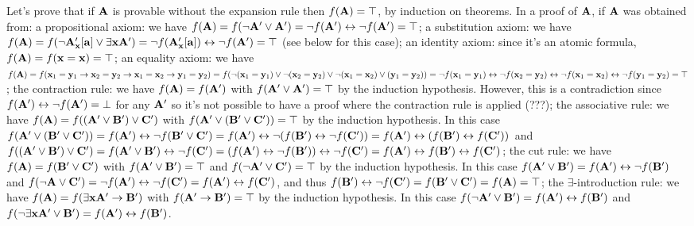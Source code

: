 Let's prove that if ${\bf A}$ is provable without the expansion rule then $f({\bf A}) = \top$, by induction on theorems.
In a proof of ${\bf A}$, if ${\bf A}$ was obtained from:
\itemitem{$\bullet$} a propositional axiom: we have $f({\bf A}) = f(\neg {\bf A}' \lor {\bf A}') = \neg f({\bf A}') \leftrightarrow \neg f({\bf A}') = \top$;
\itemitem{$\bullet$} a substitution axiom: we have 
$f({\bf A}) = f(\neg {\bf A}'_{\bf x}[{\bf a}] \lor \exists {\bf x}{\bf A}') = \neg f({\bf A}'_{\bf x}[{\bf a}]) \leftrightarrow \neg f({\bf A}') = \top$ (see below for this case);
\itemitem{$\bullet$} an identity axiom: since it's an atomic formula, $f({\bf A}) = f({\bf x} = {\bf x}) = \top$;
\itemitem{$\bullet$} an equality axiom: we have $f({\bf A}) = 
f({\bf x}_1 = {\bf y}_1 \to {\bf x}_2 = {\bf y}_2 \to {\bf x}_1 = {\bf x}_2 \to {\bf y}_1 = {\bf y}_2) =
f(\neg ({\bf x}_1 = {\bf y}_1) \lor \neg ({\bf x}_2 = {\bf y}_2) \lor \neg ({\bf x}_1 = {\bf x}_2) \lor ({\bf y}_1 = {\bf y}_2)) =
\neg f({\bf x}_1 = {\bf y}_1) \leftrightarrow \neg f({\bf x}_2 = {\bf y}_2) \leftrightarrow \neg f({\bf x}_1 = {\bf x}_2) \leftrightarrow \neg f({\bf y}_1 = {\bf y}_2) = \top$;
\itemitem{$\bullet$} the contraction rule: we have $f({\bf A}) = f({\bf A}')$ with $f({\bf A}' \lor {\bf A}') = \top$ by the induction hypothesis. 
However, this is a contradiction since $f({\bf A}') \leftrightarrow \neg f({\bf A}') = \bot$ for any $\bf A'$ so it's not possible to have a proof where the contraction rule is applied (???);
\itemitem{$\bullet$} the associative rule: we have $f({\bf A}) = f(({\bf A}' \lor {\bf B}') \lor {\bf C}')$ with $f({\bf A}' \lor ({\bf B}' \lor {\bf C}')) = \top$ by the induction hypothesis.
In this case $f({\bf A}' \lor ({\bf B}' \lor {\bf C}')) = f({\bf A}') \leftrightarrow \neg f({\bf B}' \lor {\bf C}') = f({\bf A}') \leftrightarrow \neg (f({\bf B}') \leftrightarrow \neg f({\bf C}')) =
f({\bf A}') \leftrightarrow (f({\bf B}') \leftrightarrow f({\bf C}'))$ and $f(({\bf A}' \lor {\bf B}') \lor {\bf C}') = f({\bf A}' \lor {\bf B}') \leftrightarrow \neg f({\bf C}') =
(f({\bf A}') \leftrightarrow \neg f({\bf B}')) \leftrightarrow \neg f({\bf C}') = f({\bf A}') \leftrightarrow f({\bf B}') \leftrightarrow f({\bf C}')$;
\itemitem{$\bullet$} the cut rule: we have $f({\bf A}) = f({\bf B}' \lor {\bf C}')$ with $f({\bf A}' \lor {\bf B}') = \top$ and $f(\neg {\bf A}' \lor {\bf C}') = \top$ by the induction hypothesis.
In this case $f({\bf A}' \lor {\bf B}') = f({\bf A}') \leftrightarrow \neg f({\bf B}')$ and 
$f(\neg {\bf A} \lor {\bf C}') = \neg f({\bf A}') \leftrightarrow \neg f({\bf C}') = f({\bf A}') \leftrightarrow f({\bf C}')$, and 
thus $f({\bf B}') \leftrightarrow \neg f({\bf C}') = f({\bf B}' \lor {\bf C}') = f({\bf A}) = \top$;
\itemitem{$\bullet$} the $\exists$-introduction rule: we have $f({\bf A}) = f(\exists {\bf x}{\bf A}' \to {\bf B}')$ with $f({\bf A}' \to {\bf B}') = \top$ by the induction hypothesis.
In this case $f(\neg {\bf A}' \lor {\bf B}') = f({\bf A}') \leftrightarrow f({\bf B}')$ and $f(\neg \exists {\bf x}{\bf A}' \lor {\bf B}') = f({\bf A}') \leftrightarrow f({\bf B}')$.

